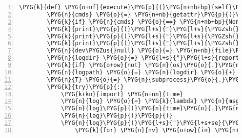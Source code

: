 \begin{Verbatim}[commandchars=\\\{\},numbers=left,firstnumber=1,stepnumber=5]
    \PYG{k}{def} \PYG{n+nf}{execute}\PYG{p}{(}\PYG{n+nb+bp}{self}\PYG{p}{,} \PYG{n}{phase}\PYG{p}{)}\PYG{p}{:}
        \PYG{n}{cmds} \PYG{o}{=} \PYG{n+nb}{getattr}\PYG{p}{(}\PYG{n+nb+bp}{self}\PYG{p}{,} \PYG{n}{phase}\PYG{p}{,} \PYG{n+nb+bp}{None}\PYG{p}{)}
        \PYG{k}{if} \PYG{n}{cmds} \PYG{o}{==} \PYG{n+nb+bp}{None}\PYG{p}{:} \PYG{k}{return}
        \PYG{k}{print}\PYG{p}{(}\PYG{l+s}{"}\PYG{l+s}{\PYGZsh{}}\PYG{l+s}{"} \PYG{o}{*} \PYG{l+m+mi}{80}\PYG{p}{)}
        \PYG{k}{print}\PYG{p}{(}\PYG{l+s}{"}\PYG{l+s}{\PYGZsh{} executing }\PYG{l+s+si}{\PYGZpc{}s}\PYG{l+s}{ }\PYG{l+s}{'}\PYG{l+s+si}{\PYGZpc{}s}\PYG{l+s}{'}\PYG{l+s}{ phase}\PYG{l+s}{"} \PYG{o}{\PYGZpc{}} \PYG{p}{(}\PYG{n+nb+bp}{self}\PYG{o}{.}\PYG{n}{name}\PYG{p}{,} \PYG{n}{phase}\PYG{p}{)}\PYG{p}{)}
        \PYG{k}{print}\PYG{p}{(}\PYG{l+s}{"}\PYG{l+s}{\PYGZsh{}}\PYG{l+s}{"}\PYG{p}{)}
        \PYG{n}{dev\PYGZus{}null} \PYG{o}{=} \PYG{n+nb}{file}\PYG{p}{(}\PYG{l+s}{"}\PYG{l+s}{/dev/null}\PYG{l+s}{"}\PYG{p}{)}
        \PYG{n}{logdir} \PYG{o}{=} \PYG{l+s}{"}\PYG{l+s}{report/buildlogs}\PYG{l+s}{"}
        \PYG{k}{if} \PYG{o+ow}{not} \PYG{n}{os}\PYG{o}{.}\PYG{n}{path}\PYG{o}{.}\PYG{n}{isdir}\PYG{p}{(}\PYG{n}{logdir}\PYG{p}{)}\PYG{p}{:} \PYG{n}{os}\PYG{o}{.}\PYG{n}{mkdir}\PYG{p}{(}\PYG{n}{logdir}\PYG{p}{)}
        \PYG{n}{logpath} \PYG{o}{=} \PYG{n}{logdir} \PYG{o}{+} \PYG{l+s}{"}\PYG{l+s}{/}\PYG{l+s+si}{\PYGZpc{}s}\PYG{l+s}{-}\PYG{l+s+si}{\PYGZpc{}s}\PYG{l+s}{.log}\PYG{l+s}{"} \PYG{o}{\PYGZpc{}} \PYG{p}{(}\PYG{n+nb+bp}{self}\PYG{o}{.}\PYG{n}{name}\PYG{p}{,} \PYG{n}{phase}\PYG{p}{)}
        \PYG{n}{T} \PYG{o}{=} \PYG{n}{subprocess}\PYG{o}{.}\PYG{n}{Popen}\PYG{p}{(}\PYG{p}{[}\PYG{l+s}{"}\PYG{l+s}{tee}\PYG{l+s}{"}\PYG{p}{,} \PYG{n}{logpath}\PYG{p}{]}\PYG{p}{,} \PYG{n}{stdin}\PYG{o}{=}\PYG{n}{subprocess}\PYG{o}{.}\PYG{n}{PIPE}\PYG{p}{)}
        \PYG{k}{try}\PYG{p}{:}
            \PYG{k+kn}{import} \PYG{n+nn}{time}
            \PYG{n}{log} \PYG{o}{=} \PYG{k}{lambda} \PYG{n}{msg}\PYG{o}{=}\PYG{l+s}{"}\PYG{l+s}{"}\PYG{p}{:} \PYG{k}{print}\PYG{p}{(}\PYG{n}{msg}\PYG{p}{,} \PYG{n+nb}{file}\PYG{o}{=}\PYG{n}{T}\PYG{o}{.}\PYG{n}{stdin}\PYG{p}{)}
            \PYG{n}{log}\PYG{p}{(}\PYG{n}{time}\PYG{o}{.}\PYG{n}{asctime}\PYG{p}{(}\PYG{p}{)}\PYG{p}{)}
            \PYG{n}{log}\PYG{p}{(}\PYG{p}{)}
            \PYG{n}{log}\PYG{p}{(}\PYG{l+s}{"}\PYG{l+s+se}{\PYGZbs{}n}\PYG{l+s}{"}\PYG{o}{.}\PYG{n}{join}\PYG{p}{(}\PYG{l+s}{"}\PYG{l+s+si}{\PYGZpc{}s}\PYG{l+s}{=}\PYG{l+s+si}{\PYGZpc{}s}\PYG{l+s}{"} \PYG{o}{\PYGZpc{}} \PYG{n}{nv}
                \PYG{k}{for} \PYG{n}{nv} \PYG{o+ow}{in} \PYG{n+nb}{filter}\PYG{p}{(}\PYG{k}{lambda} \PYG{n}{i}\PYG{p}{:} \PYG{n}{i}\PYG{p}{[}\PYG{l+m+mi}{0}\PYG{p}{]} \PYG{o+ow}{in} \PYG{p}{(}

\end{Verbatim}
